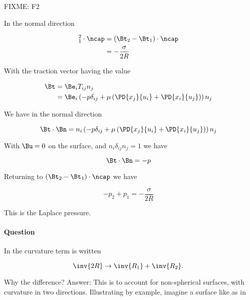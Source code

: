 FIXME: F2

In the normal direction

\begin{align*}
[\Bt]_1^2 \cdot \ncap
&= (\Bt_2 - \Bt_1) \cdot \ncap \\
&= -\frac{\sigma}{2 R} 
\end{align*}

With the traction vector having the value

\begin{align*}
\Bt 
&= \Be_i T_{ij} n_j \\
&= 
\Be_i \left( 
-p \delta_{ij} + \mu \left( 
\PD{x_j}{u_i}
+\PD{x_i}{u_j}
\right)
\right)
n_j
\end{align*}

We have in the normal direction

\begin{equation}\label{eqn:inclinedFlowWithoutConstantHeightAssumption:10}
\Bt \cdot \Bn 
=
n_i \left( 
-p \delta_{ij} + \mu \left( 
\PD{x_j}{u_i}
+\PD{x_i}{u_j}
\right)
\right) n_j
\end{equation}

With $\Bu = 0$ on the surface, and $n_i \delta_{ij} n_j = 1$ we have

\begin{equation}\label{eqn:inclinedFlowWithoutConstantHeightAssumption:30}
\Bt \cdot \Bn = -p
\end{equation}

Returning to $(\Bt_2 - \Bt_1) \cdot \ncap$ we have

\begin{equation}\label{eqn:inclinedFlowWithoutConstantHeightAssumption:50}
\boxed{
-p_2 + p_1 = -\frac{\sigma}{2 R} 
}
\end{equation}

This is the Laplace pressure.

\paragraph{Question} In \cite{landau1987course} the curvature term is written

\begin{equation}\label{eqn:inclinedFlowWithoutConstantHeightAssumption:70}
\inv{2 R} \rightarrow \inv{R_1} + \inv{R_2}.
\end{equation}

Why the difference?  Answer: This is to account for non-spherical surfaces, with curvature in two directions.  Illustrating by example, imagine a surface like as in

